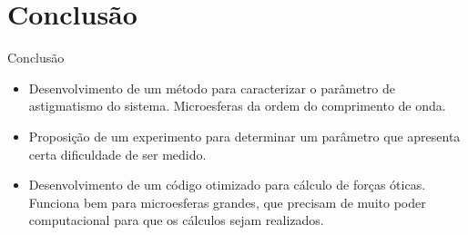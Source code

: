 \documentclass[10pt]{beamer}
\newcommand{\themename}{\textbf{\textsc{metropolis}}\xspace}
\begin{document}






\section{Conclusão}

\begin{frame}[fragile]{Conclusão} %

  \begin{center}

      \begin{itemize}

        \item Desenvolvimento de um método para caracterizar o parâmetro de astigmatismo do sistema. Microesferas da ordem do comprimento de onda.

        \item Proposição de um experimento para determinar um parâmetro que apresenta certa dificuldade de ser medido.

        \item Desenvolvimento de um código otimizado para cálculo de forças óticas. Funciona bem para microesferas grandes, que precisam de muito poder computacional para que os cálculos sejam realizados.

      \end{itemize}
 
  \end{center}

\end{frame}


\appendix
\end{document}
